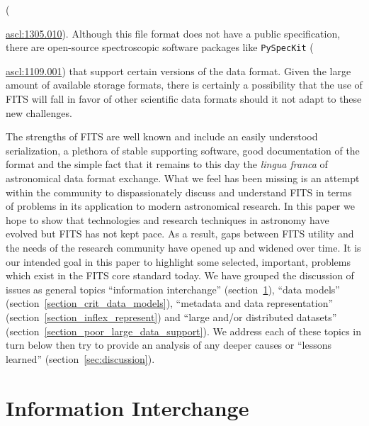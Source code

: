\documentclass[final,authoryear,5p,times,twocolumn]{elsarticle}
\begin{document}
({\href{http://ascl.net/1305.010}{ascl:1305.010}). Although this file
format does not have a public specification,  there are open-source
spectroscopic software packages like \texttt{PySpecKit}
({\href{http://ascl.net/1109.001}{ascl:1109.001}) that support certain
versions of the data format.  Given the large amount of available
storage formats, there is certainly a possibility that the use of FITS
will fall in favor of other scientific data formats should it not adapt
to these new challenges.


The strengths of FITS are well known and include an easily understood
serialization, a plethora of stable supporting software, good documentation of
the format and the simple fact that it remains to this day the \emph{lingua
franca} of astronomical data format exchange. What we feel has been missing
is an attempt within the community to
dispassionately discuss and understand FITS in terms of problems in
its application to modern astronomical research. In this paper we hope to show 
that technologies and research techniques in astronomy have evolved but FITS has 
not kept pace. As a result, gaps between FITS utility and the needs of the 
research community have opened up and widened over time. 
It is our intended goal in this paper to highlight some selected, important, 
problems which exist in the FITS core standard today. 
We have grouped the discussion of issues as general topics ``information interchange''
(section~\ref{section_poor_exchange}), ``data models'' (section~\ref{section_crit_data_models}),
``metadata and data representation'' (section~\ref{section_inflex_represent}) and
``large and/or distributed datasets'' (section~\ref{section_poor_large_data_support}).
We address each of these topics in turn below then try to provide an
analysis of any deeper causes or ``lessons learned'' (section~\ref{sec:discussion}).



\section{Information Interchange}
\label{section_poor_exchange}

}}
\end{document}
